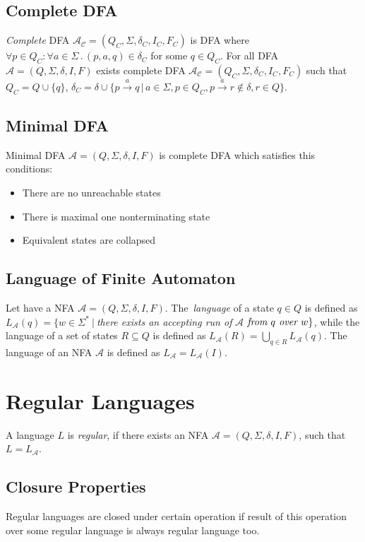   \subsection{Complete DFA}
  \label{defCompleteDFA}
  \emph{Complete} DFA $\mathcal{A_C}=(Q_C,\Sigma,\delta_C,I_C,F_C)$ is DFA where $\forall p\in Q_C:\forall a\in \Sigma\,.\, (p,a,q)\in\delta_C$ 
  for some $q\in Q_C$.
  For all DFA $\mathcal{A}=(Q,\Sigma,\delta,I,F)$ exists complete DFA $\mathcal{A_C}=(Q_C,\Sigma,\delta_C,I_C,F_C)$ such that $Q_C=Q\cup\{q\}$,
  $\delta_C = \delta \cup \{p\xrightarrow{a}q\,|\,a\in\Sigma,p\in Q_C,p\xrightarrow{a}r\not\in\delta,r\in Q\}$.

	\subsection{Minimal DFA}
	\label{defMinDFA}
		Minimal DFA $\mathcal{A}=(Q,\Sigma,\delta,I,F)$ is complete DFA which satisfies this conditions:
		\begin{itemize}
			\item There are no unreachable states
			\item There is maximal one nonterminating state
			\item Equivalent states are collapsed
		\end{itemize}


  \subsection{Language of Finite Automaton}
  Let have a NFA $\mathcal{A}=(Q,\Sigma,\delta,I,F)$.
  The~\emph{language} of a state $q \in Q$ is defined as 
  $L_\mathcal{A}(q) = \{w\in \Sigma^{*}\ |\ $\emph{there exists an accepting run of }$
  \mathcal{A}$$ 
  \emph{ from }q\emph{ over }w\}$, while the language of a set of states $R\subseteq Q$ is defined as $L_{\mathcal{A}}(R)=\bigcup_{q\in R}L_{\mathcal{A}}(q)$.
  The language of an NFA $\mathcal{A}$ is defined as $L_{\mathcal{A}}=L_{\mathcal{A}}(I)$.

\section{Regular Languages}
		A language $L$ is \emph{regular}, if there exists an NFA $\mathcal{A}=(Q,\Sigma,\delta,I,F)$, such that $L=L_\mathcal{A}$.

    \subsection{Closure Properties}
    Regular languages are closed under certain operation if result of this operation over some regular language is always regular language too.

